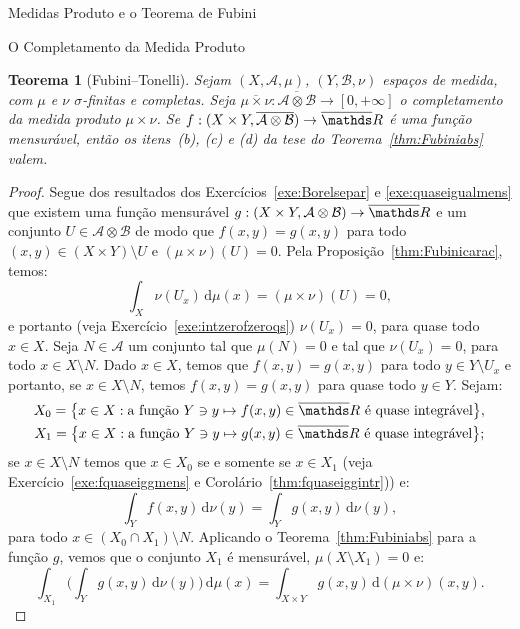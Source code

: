 \documentclass[oneside,final,11pt]{amsbook}
\newcommand{\R}{\mathds R}
\newcommand{\dd}{\mathrm d}
\theoremstyle{remark}\newtheorem{exercise}{Exercício}[chapter]
\theoremstyle{remark}\newtheorem{*exercise}[exercise]{\hbox to 0pt{\hskip 0pt minus 1fil*}Exercício}
\theoremstyle{definition}\newtheorem{exdefin}{Definição}[chapter]
\theoremstyle{plain}\newtheorem{teo}{Teorema}[section]
\theoremstyle{plain}\newtheorem{lem}[teo]{Lema}
\theoremstyle{plain}\newtheorem{prop}[teo]{Proposição}
\theoremstyle{plain}\newtheorem{cor}[teo]{Corolário}
\theoremstyle{definition}\newtheorem{defin}[teo]{Definição}
\theoremstyle{remark}\newtheorem{rem}[teo]{Observação}
\theoremstyle{definition}\newtheorem{notation}[teo]{Notação}
\theoremstyle{definition}\newtheorem{convention}[teo]{Convenção}
\theoremstyle{definition}\newtheorem{example}[teo]{Exemplo}
\numberwithin{section}{chapter}
\numberwithin{equation}{section}
\begin{document}
\begin{chapter}{Medidas Produto e o Teorema de Fubini}
\begin{section}{O Completamento da Medida Produto}
\begin{teo}[Fubini--Tonelli]%
\label{thm:Fubinicompl}
Sejam $(X,\mathcal A,\mu)$, $(Y,\mathcal B,\nu)$ espaços de medida, com $\mu$ e $\nu$ $\sigma$-finitas
e completas. Seja $\overline{\mu\times\nu}:\overline{\mathcal A\otimes\mathcal B}\to[0,+\infty]$
o completamento da medida produto $\mu\times\nu$. Se $f:(X\times Y,\overline{\mathcal A\otimes\mathcal B})\to\overline\R$
é uma função mensurável, então os itens~(b), (c) e (d) da tese do Teorema~\ref{thm:Fubiniabs} valem.
\end{teo}
\begin{proof}
Segue dos resultados dos Exercícios~\ref{exe:Borelsepar} e \ref{exe:quaseigualmens}
que existem uma função mensurável $g:(X\times Y,\mathcal A\otimes\mathcal B)\to\overline\R$
e um conjunto $U\in\mathcal A\otimes\mathcal B$ de modo que $f(x,y)=g(x,y)$ para todo $(x,y)\in(X\times Y)\setminus U$
e $(\mu\times\nu)(U)=0$. Pela Proposição~\ref{thm:Fubinicarac}, temos:
\[\int_X\nu(U_x)\,\dd\mu(x)=(\mu\times\nu)(U)=0,\]
e portanto (veja Exercício~\ref{exe:intzerofzeroqs}) $\nu(U_x)=0$, para quase todo $x\in X$. Seja $N\in\mathcal A$
um conjunto tal que $\mu(N)=0$ e tal que $\nu(U_x)=0$, para todo $x\in X\setminus N$. Dado $x\in X$, temos que
$f(x,y)=g(x,y)$ para todo $y\in Y\setminus U_x$ e portanto, se $x\in X\setminus N$, temos $f(x,y)=g(x,y)$
para quase todo $y\in Y$. Sejam:
\begin{gather*}
X_0=\big\{x\in X:\text{a função $Y\ni y\mapsto f(x,y)\in\overline\R$ é quase integrável}\big\},\\
X_1=\big\{x\in X:\text{a função $Y\ni y\mapsto g(x,y)\in\overline\R$ é quase integrável}\big\};
\end{gather*}
se $x\in X\setminus N$ temos que $x\in X_0$ se e somente se $x\in X_1$ (veja Exercício~\ref{exe:fquaseiggmens}
e Corolário~\ref{thm:fquaseiggintr})) e:
\begin{equation}\label{eq:intfequalintgdy}
\int_Yf(x,y)\,\dd\nu(y)=\int_Yg(x,y)\,\dd\nu(y),
\end{equation}
para todo $x\in(X_0\cap X_1)\setminus N$. Aplicando o Teorema~\ref{thm:Fubiniabs} para a função $g$, vemos
que o conjunto $X_1$ é mensurável, $\mu(X\setminus X_1)=0$ e:
\begin{equation}\label{eq:teoFubprag}
\int_{X_1}\Big(\int_Yg(x,y)\,\dd\nu(y)\Big)\,\dd\mu(x)=\int_{X\times Y}g(x,y)\,\dd(\mu\times\nu)(x,y).

\end{equation}
\end{proof}
\end{section}
\end{chapter}
\end{document}
